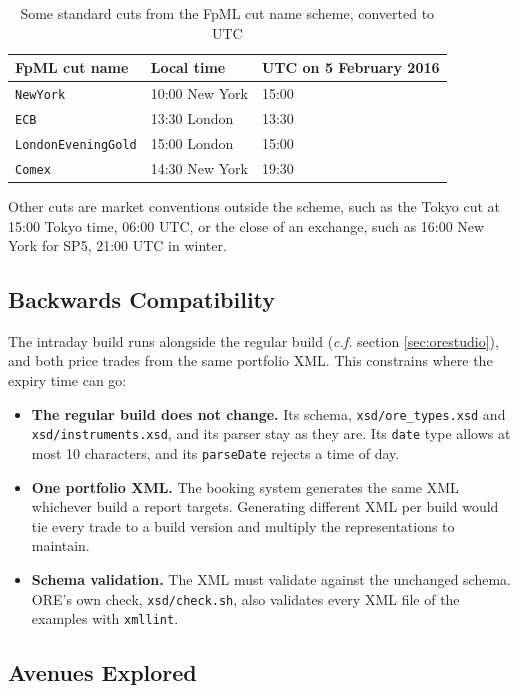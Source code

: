 \documentclass[12pt, a4paper]{article}
\begin{document}
\begin{table}[H]
\centering
\begin{tabular}{|l|l|l|}
\hline
FpML cut name & Local time & UTC on 5 February 2016 \\
\hline
\texttt{NewYork} & 10:00 New York & 15:00 \\
\texttt{ECB} & 13:30 London & 13:30 \\
\texttt{LondonEveningGold} & 15:00 London & 15:00 \\
\texttt{Comex} & 14:30 New York & 19:30 \\
\hline
\end{tabular}
\caption{Some standard cuts from the FpML cut name scheme, converted to UTC}
\label{tab:fpmlcuts}
\end{table}

Other cuts are market conventions outside the scheme, such as the Tokyo cut at 15:00 Tokyo time, 06:00 UTC, or the close
of an exchange, such as 16:00 New York for SP5, 21:00 UTC in winter.

\subsection{Backwards Compatibility}\label{sec:compat}

The intraday build runs alongside the regular build (\textit{c.f.} section \ref{sec:orestudio}), and both price trades from the same
portfolio XML. This constrains where the expiry time can go:

\begin{itemize}
\item \textbf{The regular build does not change.} Its schema, \texttt{xsd/ore\_types.xsd} and
  \texttt{xsd/instruments.xsd}, and its parser stay as they are. Its \texttt{date} type allows at most 10 characters,
  and its \texttt{parseDate} rejects a time of day.
\item \textbf{One portfolio XML.} The booking system generates the same XML whichever build a report targets.
  Generating different XML per build would tie every trade to a build version and multiply the representations to
  maintain.
\item \textbf{Schema validation.} The XML must validate against the unchanged schema. ORE's own check,
  \texttt{xsd/check.sh}, also validates every XML file of the examples with \texttt{xmllint}.
\end{itemize}

\subsection{Avenues Explored}
\end{document}
